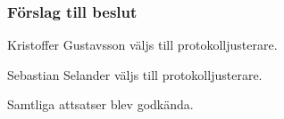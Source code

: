 \documentclass[protokoll]{dvd}
\begin{document}
\subsubsection*{Förslag till beslut}

\begin{attsatser}
    \item Kristoffer Gustavsson väljs till protokolljusterare.
    \item Sebastian Selander väljs till protokolljusterare.
\end{attsatser}

Samtliga attsatser blev godkända.

\newpage

\end{document}
